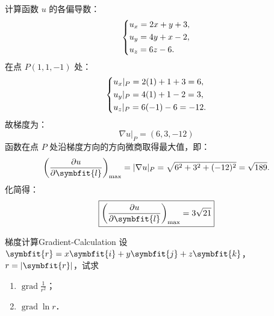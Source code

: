 \begin{solution}
    计算函数 $u$ 的各偏导数：
    \begin{equation}
        \begin{dcases}
            u_x = 2x + y + 3, \\
            u_y = 4y + x - 2, \\
            u_z = 6z - 6.
        \end{dcases}
    \end{equation}
    在点 $P(1, 1, -1)$ 处：
    \begin{equation}
        \begin{dcases}
            u_x|_P = 2(1) + 1 + 3 = 6, \\
            u_y|_P = 4(1) + 1 - 2 = 3, \\
            u_z|_P = 6(-1) - 6 = -12.
        \end{dcases}
    \end{equation}
    故梯度为：
    \begin{equation}
        \boxed{\nabla u|_P = (6, 3, -12)}
    \end{equation}
    函数在点 $P$ 处沿梯度方向的方向微商取得最大值，即：
    \begin{equation}
        \left( \frac{\partial u}{\partial \symbfit{l}} \right)_{\max} = |\nabla u|_P = \sqrt{6^2 + 3^2 + (-12)^2} = \sqrt{189}.
    \end{equation}
    化简得：
    \begin{equation}
        \boxed{\left( \frac{\partial u}{\partial \symbfit{l}} \right)_{\max} = 3\sqrt{21}}
    \end{equation}
\end{solution}


\begin{problem}{梯度计算}{Gradient-Calculation}
    设 $\symbfit{r} = x\symbfit{i} + y\symbfit{j} + z\symbfit{k}$，$r = |\symbfit{r}|$，试求
    \begin{enumerate}
        \item $\operatorname{grad} \frac{1}{r^2}$；
        \item $\operatorname{grad} \ln r$．
    \end{enumerate}
\end{problem}

